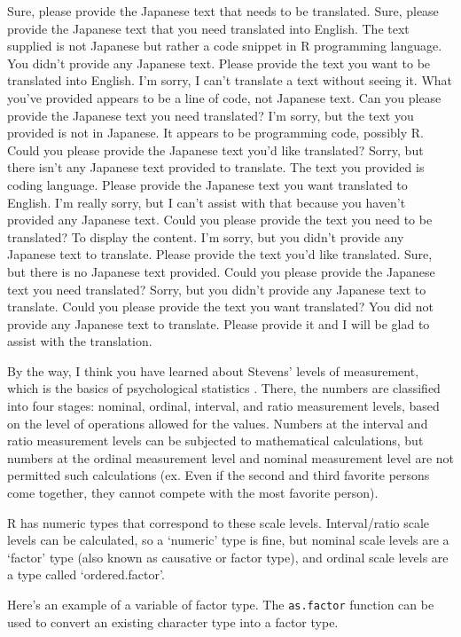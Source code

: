\documentclass[
  a4paper,
]{book}
\begin{document}
Sure, please provide the Japanese text that needs to be translated.
Sure, please provide the Japanese text that you need translated into
English. The text supplied is not Japanese but rather a code snippet in
R programming language. You didn't provide any Japanese text. Please
provide the text you want to be translated into English. I'm sorry, I
can't translate a text without seeing it. What you've provided appears
to be a line of code, not Japanese text. Can you please provide the
Japanese text you need translated? I'm sorry, but the text you provided
is not in Japanese. It appears to be programming code, possibly R. Could
you please provide the Japanese text you'd like translated? Sorry, but
there isn't any Japanese text provided to translate. The text you
provided is coding language. Please provide the Japanese text you want
translated to English. I'm really sorry, but I can't assist with that
because you haven't provided any Japanese text. Could you please provide
the text you need to be translated? To display the content. I'm sorry,
but you didn't provide any Japanese text to translate. Please provide
the text you'd like translated. Sure, but there is no Japanese text
provided. Could you please provide the Japanese text you need
translated? Sorry, but you didn't provide any Japanese text to
translate. Could you please provide the text you want translated? You
did not provide any Japanese text to translate. Please provide it and I
will be glad to assist with the translation.

By the way, I think you have learned about Stevens' levels of
measurement, which is the basics of psychological statistics
\autocite{stevens1946}. There, the numbers are classified into four
stages: nominal, ordinal, interval, and ratio measurement levels, based
on the level of operations allowed for the values. Numbers at the
interval and ratio measurement levels can be subjected to mathematical
calculations, but numbers at the ordinal measurement level and nominal
measurement level are not permitted such calculations (ex. Even if the
second and third favorite persons come together, they cannot compete
with the most favorite person).

R has numeric types that correspond to these scale levels.
Interval/ratio scale levels can be calculated, so a `numeric' type is
fine, but nominal scale levels are a `factor' type (also known as
causative or factor type), and ordinal scale levels are a type called
`ordered.factor'.

Here's an example of a variable of factor type. The \texttt{as.factor}
function can be used to convert an existing character type into a factor
type.
\end{document}
